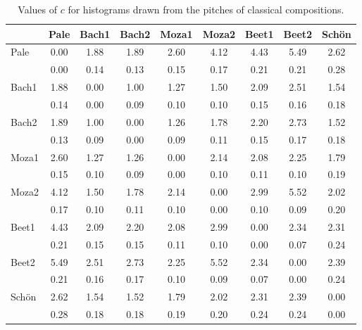 \begin{table}[h!]
\begin{center}
\begin{tabular}{| l | c | c | c | c | c | c | c | c |}\hline
 & Pale & Bach1 & Bach2 & Moza1 & Moza2 & Beet1 & Beet2 & Sch\"on \\\hline
Pale & 0.00  & 1.88  & 1.89  & 2.60  & 4.12  & 4.43  & 5.49  & 2.62 \\\hline
 & 0.00  & 0.14  & 0.13  & 0.15  & 0.17  & 0.21  & 0.21  & 0.28 \\\hline
Bach1 & 1.88  & 0.00  & 1.00  & 1.27  & 1.50  & 2.09  & 2.51  & 1.54 \\\hline
 & 0.14  & 0.00  & 0.09  & 0.10  & 0.10  & 0.15  & 0.16  & 0.18 \\\hline
Bach2 & 1.89  & 1.00  & 0.00  & 1.26  & 1.78  & 2.20  & 2.73  & 1.52 \\\hline
 & 0.13  & 0.09  & 0.00  & 0.09  & 0.11  & 0.15  & 0.17  & 0.18 \\\hline
Moza1 & 2.60  & 1.27  & 1.26  & 0.00  & 2.14  & 2.08  & 2.25  & 1.79 \\\hline
 & 0.15  & 0.10  & 0.09  & 0.00  & 0.10  & 0.11  & 0.10  & 0.19 \\\hline
Moza2 & 4.12  & 1.50  & 1.78  & 2.14  & 0.00  & 2.99  & 5.52  & 2.02 \\\hline
 & 0.17  & 0.10  & 0.11  & 0.10  & 0.00  & 0.10  & 0.09  & 0.20 \\\hline
Beet1 & 4.43  & 2.09  & 2.20  & 2.08  & 2.99  & 0.00  & 2.34  & 2.31 \\\hline
 & 0.21  & 0.15  & 0.15  & 0.11  & 0.10  & 0.00  & 0.07  & 0.24 \\\hline
Beet2 & 5.49  & 2.51  & 2.73  & 2.25  & 5.52  & 2.34  & 0.00  & 2.39 \\\hline
 & 0.21  & 0.16  & 0.17  & 0.10  & 0.09  & 0.07  & 0.00  & 0.24 \\\hline
Sch\"on & 2.62  & 1.54  & 1.52  & 1.79  & 2.02  & 2.31  & 2.39  & 0.00 \\\hline
 & 0.28  & 0.18  & 0.18  & 0.19  & 0.20  & 0.24  & 0.24  & 0.00 \\\hline
\end{tabular}
\caption{Values of $c$ for histograms drawn from the pitches of classical compositions.}
\end{center}
\end{table}